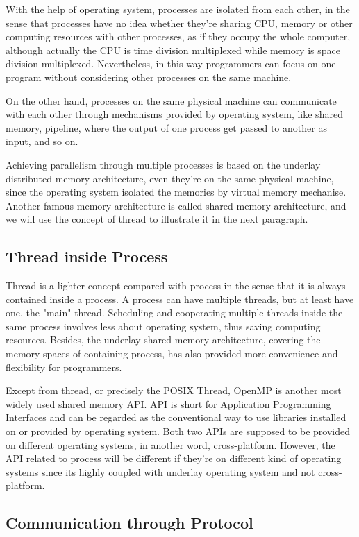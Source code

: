 \documentclass[12pt,a4]{report}
\begin{document}
With the help of operating system, processes are isolated from each other, in the sense that processes have no idea whether they're sharing CPU, memory or other computing resources with other processes, as if they occupy the whole computer, although actually the CPU is time division multiplexed while memory is space division multiplexed. Nevertheless, in this way programmers can focus on one program without considering other processes on the same machine.

On the other hand, processes on the same physical machine can communicate with each other through mechanisms provided by operating system, like shared memory, pipeline, where the output of one process get passed to another as input, and so on.

Achieving parallelism through multiple processes is based on the underlay distributed memory architecture, even they're on the same physical machine, since the operating system isolated the memories by virtual memory mechanise. Another famous memory architecture is called shared memory architecture, and we will use the concept of thread to illustrate it in the next paragraph.

\subsection{Thread inside Process}

Thread is a lighter concept compared with process in the sense that it is always contained inside a process. A process can have multiple threads, but at least have one, the "main" thread. Scheduling and cooperating multiple threads inside the same process involves less about operating system, thus saving computing resources. Besides, the underlay shared memory architecture, covering the memory spaces of containing process, has also provided more convenience and flexibility for programmers.

Except from thread, or precisely the POSIX Thread, OpenMP is another most widely used shared memory API. API is short for Application Programming Interfaces and can be regarded as the conventional way to use libraries installed on or provided by operating system. Both two APIs are supposed to be provided on different operating systems, in another word, cross-platform. However, the API related to process will be different if they're on different kind of operating systems since its highly coupled with underlay operating system and not cross-platform.

\subsection{Communication through Protocol}
\end{document}
